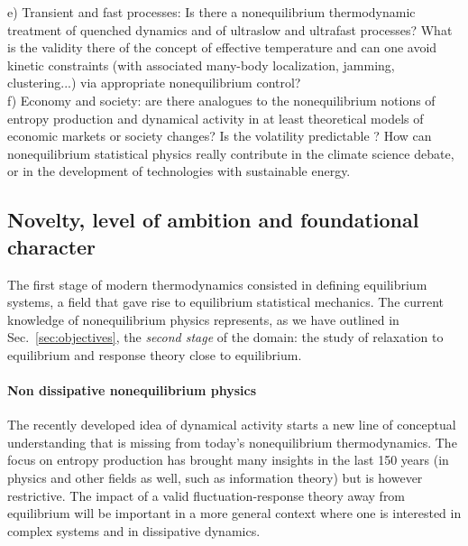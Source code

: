e) Transient and fast processes: Is there a nonequilibrium thermodynamic treatment of quenched dynamics and of ultraslow and ultrafast processes?  What is the validity there of the concept of effective temperature and can one avoid kinetic constraints (with associated many-body localization, jamming, clustering...) via appropriate nonequilibrium control?\\
f) Economy and society: are there analogues to the nonequilibrium notions of entropy production and dynamical activity in at least theoretical models of economic markets or society changes?  Is the volatility predictable ?  How can nonequilibrium statistical physics really contribute in the climate science debate, or in the development of technologies with  sustainable energy.


\subsection{Novelty, level of ambition and foundational character}\label{sec:progress}


The first stage of modern thermodynamics consisted in defining equilibrium systems, a field
that gave rise to equilibrium statistical mechanics. The current knowledge of nonequilibrium
physics represents, as we have outlined in Sec.~\ref{sec:objectives}, the {\em second stage}
of the domain: the study of relaxation to equilibrium and response theory close to
equilibrium.

\paragraph{Non dissipative nonequilibrium physics}

The recently developed idea of dynamical activity starts a new line of conceptual
understanding that is missing from today's nonequilibrium thermodynamics. The focus on
entropy production has brought many insights in the last 150 years (in physics and other
fields as well, such as information theory) but is however restrictive.
%
The impact of a valid fluctuation-response theory away from equilibrium will be important in
a more general context where one is interested in complex systems and in dissipative
dynamics.


